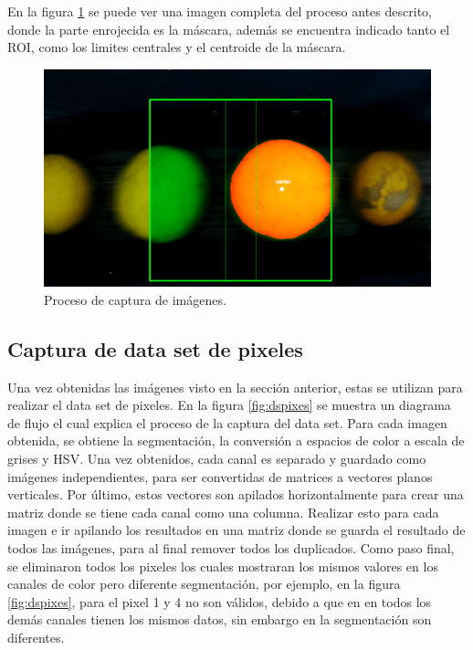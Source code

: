 \documentclass[twoside,spanish,ESP,MSc]{plantillaLabUPV}
\theoremstyle{definition}
\begin{document}
En la figura \ref{fig:framito} se puede ver una imagen completa del proceso antes descrito, donde la parte enrojecida es la máscara, además se encuentra indicado tanto el ROI, como los limites centrales y el centroide de la máscara.

\begin{figure}
	\centering
	\includegraphics[width=0.7\linewidth]{framito}
	\caption{Proceso de captura de imágenes.}
	\label{fig:framito}
\end{figure}


\subsection{Captura de data set de pixeles}
Una vez obtenidas las imágenes visto en la sección anterior, estas se utilizan para realizar el data set de pixeles. En la figura \ref{fig:dspixes} se muestra un diagrama de flujo el cual explica el proceso de la captura del data set. Para cada imagen obtenida, se obtiene la segmentación, la conversión a espacios de color a escala de grises y HSV. Una vez obtenidos, cada canal es separado y guardado como imágenes independientes, para ser convertidas de matrices a vectores planos verticales. Por último, estos vectores son apilados horizontalmente para crear una matriz donde se tiene cada canal como una columna. Realizar esto para cada imagen e ir apilando los resultados en una matriz donde se guarda el resultado de todos las imágenes, para al final remover todos los duplicados. Como paso final, se eliminaron todos los pixeles los cuales mostraran los mismos valores en los canales de color pero diferente segmentación, por ejemplo, en la figura \ref{fig:dspixes}, para el pixel 1 y 4 no son válidos, debido a que en en todos los demás canales tienen los mismos datos, sin embargo en la segmentación son diferentes.\\

\end{document}
